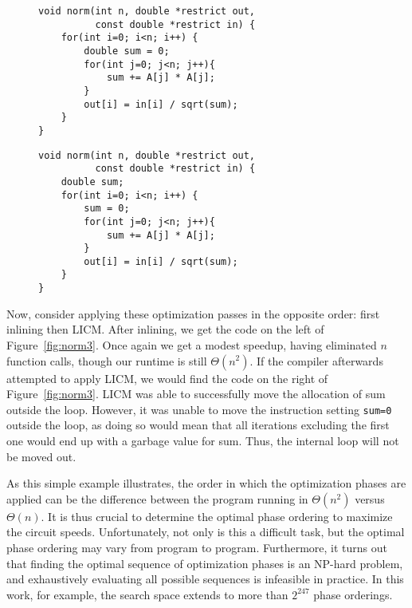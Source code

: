 \begin{figure*}[!h]
     \centering
     \begin{subfigure}[b]{0.46\textwidth}
         \centering
\begin{verbatim}
void norm(int n, double *restrict out,
          const double *restrict in) {
    for(int i=0; i<n; i++) {
        double sum = 0;
        for(int j=0; j<n; j++){
            sum += A[j] * A[j];
        }
        out[i] = in[i] / sqrt(sum);
    }
}
\end{verbatim}
\end{subfigure}
     \hfill
     \begin{subfigure}[b]{0.46\textwidth}
         \centering
\begin{verbatim}
void norm(int n, double *restrict out,
          const double *restrict in) {
    double sum;
    for(int i=0; i<n; i++) {
        sum = 0;
        for(int j=0; j<n; j++){
            sum += A[j] * A[j];
        }
        out[i] = in[i] / sqrt(sum);
    }
}
\end{verbatim}
     \end{subfigure}
          \vspace{-0.3cm}
     \caption{Progressively applying inlining (left) then LICM (right) to the code in Figure~\ref{fig:norm1}.}
     \label{fig:norm3}
\end{figure*}

Now, consider applying these optimization passes in the opposite order: first inlining then LICM. After inlining, we get the code on the left of Figure~\ref{fig:norm3}. Once again we get a modest speedup, having eliminated $n$ function calls, though our runtime is still $\Theta(n^2)$. If the compiler afterwards attempted to apply LICM, we would find the code on the right of Figure~\ref{fig:norm3}. LICM was able to successfully move the allocation of sum outside the loop. However, it was unable to move the instruction setting \verb|sum=0| outside the loop, as doing so would mean that all iterations excluding the first one would end up with a garbage value for sum. Thus, the internal loop will not be moved out.

As this simple example illustrates, the order in which the optimization phases are applied can be the difference between the program running in $\Theta(n^2)$ versus $\Theta(n)$. It is thus crucial to determine the optimal phase ordering to maximize the circuit speeds. Unfortunately, not only is this a difficult task, but the optimal phase ordering may vary from program to program. Furthermore, it turns out that finding the optimal sequence of optimization phases is an NP-hard problem, and exhaustively evaluating all possible sequences is infeasible in practice. In this work, for example, the search space extends to more than $2^{247}$ phase orderings.

